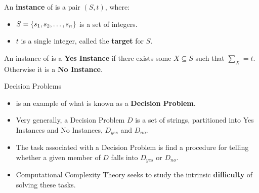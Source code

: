 \documentclass[c]{beamer}
\begin{document}
\begin{frame}{\subsum{}}

    An \textbf{instance} of \subsum{} is a pair $(S, t)$, where:

    \begin{itemize}
    \item $S = \{s_1, s_2, \ldots, s_n\}$ is a set of integers.
    \item $t$ is a single integer, called the \textbf{target} for $S$.
    \end{itemize}\pause

    An instance of \subsum{} is a \textbf{Yes Instance} if
    there exists some $X \subseteq S$ such that $\sum_X = t$.\\
    Otherwise it is a \textbf{No Instance}.\pause
\end{frame}

\begin{frame}{Decision Problems}

  \begin{itemize}
  \item \subsum{} is an example of what is known as a \textbf{Decision
      Problem}.\pause
  \item Very generally, a Decision Problem $D$ is a set of strings,
    partitioned into Yes Instances and No Instances, $D_{yes}$ and
    $D_{no}$.\pause
  \item The task associated with a Decision Problem is find a
    procedure for telling whether a given member of $D$ falls into
    $D_{yes}$ or $D_{no}$.\pause
  \item Computational Complexity Theory seeks to study the intrinsic
    \textbf{difficulty} of solving these tasks.
  \end{itemize}

\end{frame}

  

\end{document}
